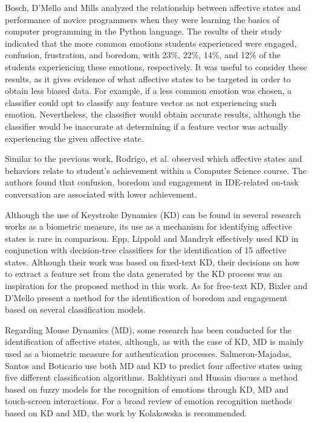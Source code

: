 \documentclass[runningheads,a4paper]{llncs}
\begin{document}
Bosch, D'Mello and Mills \cite{emotions-novices-programming} analyzed the relationship between affective states and performance of novice programmers when they were learning the basics of computer programming in the Python language. The results of their study indicated that the more common emotions students experienced were engaged, confusion, frustration, and boredom, with 23\%, 22\%, 14\%, and 12\% of the students experiencing these emotions, respectively. It was useful to consider these results, as it gives evidence of what affective states to be targeted in order to obtain less biased data. For example, if a less common emotion was chosen, a classifier could opt to classify any feature vector as not experiencing such emotion. Nevertheless, the classifier would obtain accurate results, although the classifier would be inaccurate at determining if a feature vector was actually experiencing the given affective state.

Similar to the previous work, Rodrigo, et al. \cite{emotions-novices-programming2} observed which affective states and behaviors relate to student's achievement within a Computer Science course. The authors found that confusion, boredom and engagement in IDE-related on-task conversation are associated with lower achievement.

Although the use of Keystroke Dynamics (KD) can be found in several research works as a biometric measure, its use as a mechanism for identifying affective states is rare in comparison. Epp, Lippold and Mandryk \cite{keystroke-dynamics1} effectively used KD in conjunction with decision-tree classifiers for the identification of 15 affective states. Although their work was based on fixed-text KD, their decisions on how to extract a feature set from the data generated by the KD process was an inspiration for the proposed method in this work. As for free-text KD, Bixler and D'Mello \cite{keystroke-dynamics2} present a method for the identification of boredom and engagement based on several classification models.

Regarding Mouse Dynamics (MD), some research has been conducted for the identification of affective states, although, as with the case of KD, MD is mainly used as a biometric measure for authentication processes. Salmeron-Majadas, Santos and Boticario \cite{mouse-dynamics1} use both MD and KD to predict four affective states using five different classification algorithms. Bakhtiyari and Husain \cite{mouse-dynamics2} discuss a method based on fuzzy models for the recognition of emotions through KD, MD and touch-screen interactions. For a broad review of emotion recognition methods based on KD and MD, the work by Kolakowska \cite{keystroke-mouse-review} is recommended.
\end{document}

